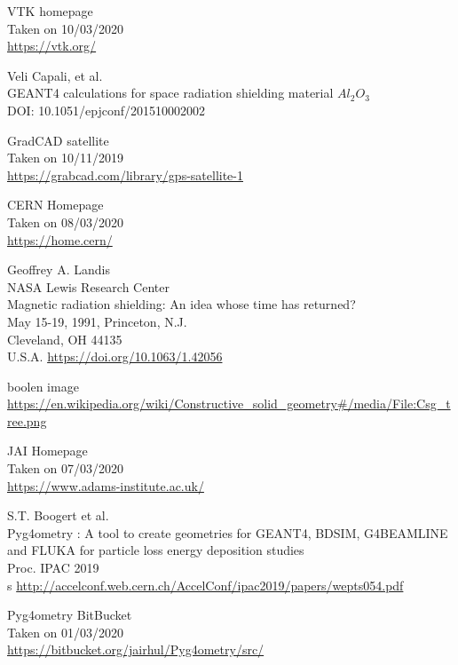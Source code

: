 \documentclass[12pt,a4paper]{article}
\begin{document}
\begin{thebibliography}{1}


	VTK homepage\\
	Taken on 10/03/2020\\
	\url{https://vtk.org/}

	Veli Capali, et al.\\
	GEANT4 calculations for space radiation shielding material $Al_2O_3$\\
	DOI: 10.1051/epjconf/201510002002

	GradCAD satellite\\
	Taken on 10/11/2019\\	
	\url{https://grabcad.com/library/gps-satellite-1}

	CERN Homepage\\
	Taken on 08/03/2020\\
	\url{https://home.cern/}
	
	Geoffrey A. Landis\\
	NASA Lewis Research Center\\
	Magnetic radiation shielding: An idea whose time has returned?\\
	May 15-19, 1991, Princeton, N.J.\\
	Cleveland, OH 44135\\
	U.S.A.
	\url{https://doi.org/10.1063/1.42056}
	
	boolen image\\
	\url{https://en.wikipedia.org/wiki/Constructive_solid_geometry#/media/File:Csg_tree.png}
	
	JAI Homepage\\
	Taken on 07/03/2020\\
	\url{https://www.adams-institute.ac.uk/}

	S.T. Boogert et al.\\
	Pyg4ometry : A tool to create geometries for GEANT4, BDSIM, G4BEAMLINE and FLUKA for particle loss energy deposition studies\\
	Proc. IPAC 2019\\s
	\url{http://accelconf.web.cern.ch/AccelConf/ipac2019/papers/wepts054.pdf}

	Pyg4ometry BitBucket\\
	Taken on 01/03/2020\\
	\url{https://bitbucket.org/jairhul/Pyg4ometry/src/}
	

\end{thebibliography}
\end{document}
